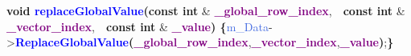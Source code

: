     \tab\textbf{\textcolor{BrickRed}{void} \textcolor{blue}{replaceGlobalValue}(const \textcolor{BrickRed}{int}} \& \textbf{\textcolor{Purple}{\_global\_row\_index}},\newline\tab\tab\tab\tab\tab\tab\ \ \textbf{const \textcolor{BrickRed}{int}} \& \textbf{\textcolor{Purple}{\_vector\_index}},\newline\tab\tab\tab\tab\tab\tab\ \ \textbf{const \textcolor{BrickRed}{int}} \& \textbf{\textcolor{Purple}{\_value}) \{}\newline\tab\tab\textcolor{RoyalBlue}{m\_Data}-\textgreater\textbf{\textcolor{blue}{ReplaceGlobalValue}(\textcolor{Purple}{\_global\_row\_index}},\textbf{\textcolor{Purple}{\_vector\_index}},\textbf{\textcolor{Purple}{\_value})};\newline\tab\textbf{\}}\newline
